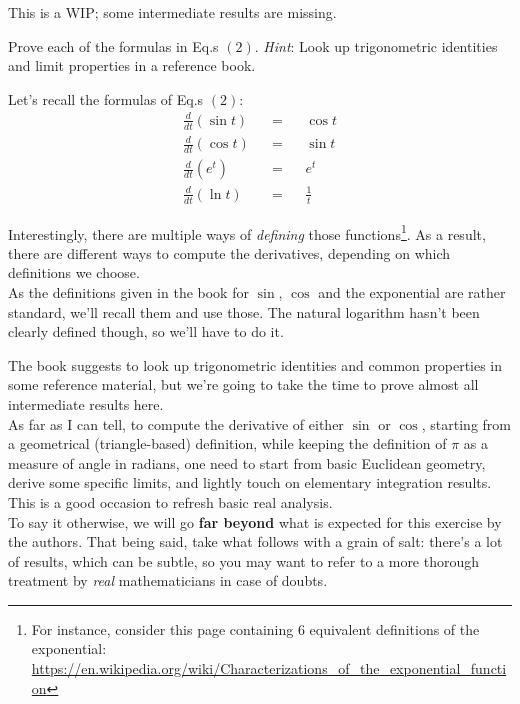 \documentclass[solutions.tex]{subfiles}
\begin{document}
\maketitle
\begin{remark} This is a WIP; some intermediate results are missing.
\end{remark}
\begin{exercise} Prove each of the formulas in Eq.s $(2)$.
\textit{Hint}: Look up trigonometric identities and limit
properties in a reference book.
\end{exercise}

Let's recall the formulas of Eq.s $(2)$:
\begin{equation*} \begin{aligned}
	\frac{d}{dt}(\sin t) &&=&& \cos t \\
	\frac{d}{dt}(\cos t) &&=&& \sin t \\
	\frac{d}{dt}(e^t) &&=&& e^t \\
	\frac{d}{dt}(\ln t) &&=&& \frac{1}{t}
\end{aligned} \end{equation*}

\begin{remark}
Interestingly, there are multiple ways of \textit{defining}
those functions\footnote{For instance, consider this page
containing $6$ equivalent definitions of the exponential:
\url{https://en.wikipedia.org/wiki/Characterizations\_of\_the\_exponential\_function}}.
As a result, there are different ways to compute the derivatives,
depending on which definitions we choose. \\

As the definitions given in the book for $\sin$, $\cos$ and
the exponential are rather standard, we'll recall them and use
those. The natural logarithm hasn't been clearly defined though,
so we'll have to do it.
\end{remark}

\begin{remark} The book suggests to look up trigonometric
identities and common properties in some reference material, but
we're going to take the time to prove almost all intermediate results
here. \\

As far as I can tell, to compute the derivative of either $\sin$
or $\cos$, starting from a geometrical (triangle-based) definition,
while keeping the definition of $\pi$ as a measure of angle in radians,
one need to start from basic Euclidean geometry, derive
some specific limits, and lightly touch on elementary integration
results. This is a good occasion to refresh basic real analysis. \\

To say it otherwise, we will go \textbf{far beyond} what is expected
for this exercise by the authors. That being said, take what follows with a
grain of salt: there's a lot of results, which can be subtle, so you may
want to refer to a more thorough treatment by \textit{real} mathematicians
in case of doubts.
\end{remark}
\end{document}
